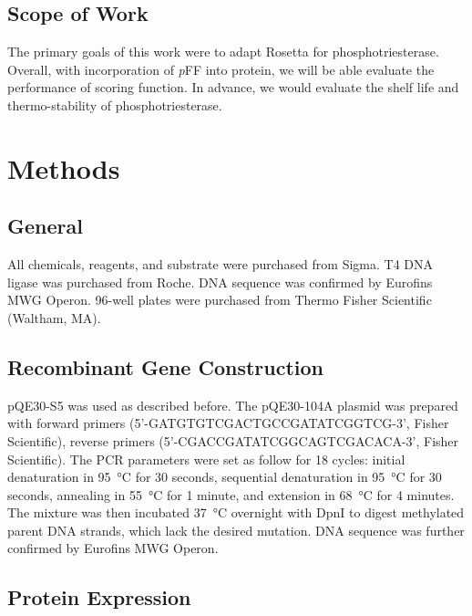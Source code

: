 \begin{refsection}
\subsection{Scope of Work}

The primary goals of this work were to adapt Rosetta for phosphotriesterase.
Overall, with incorporation of \emph{p}FF into protein, we will be able
evaluate the performance of scoring function. In advance, we would evaluate the
shelf life and thermo-stability of phosphotriesterase.

\section{Methods}

\subsection{General}

All chemicals, reagents, and substrate were purchased from Sigma. T4 DNA ligase
was purchased from Roche. DNA sequence was confirmed by Eurofins MWG Operon.
96-well plates were purchased from Thermo Fisher Scientific (Waltham, MA).

\subsection{Recombinant Gene Construction}

pQE30-S5 was used as described before.\cite{Baker2011b} The pQE30-104A plasmid
was prepared with forward primers (5’-GATGTGTCGACTGCCGATATCGGTCG-3’, Fisher
Scientific), reverse primers (5’-CGACCGATATCGGCAGTCGACACA-3’, Fisher
Scientific). The PCR parameters were set as follow for 18 cycles: initial
denaturation in \SI{95}{\celsius} for 30 seconds, sequential denaturation in
\SI{95}{\celsius} for 30 seconds, annealing in \SI{55}{\celsius} for 1 minute,
and extension in \SI{68}{\celsius} for 4 minutes. The mixture was then
incubated \SI{37}{\celsius} overnight with DpnI to digest methylated parent DNA
strands, which lack the desired mutation. DNA sequence was further confirmed by
Eurofins MWG Operon.

\subsection{Protein Expression}


\end{refsection}
